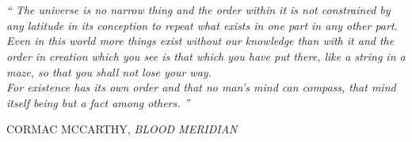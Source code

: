 
\updateRibbons{\textbf{\TEXTquotation}}{}
\chapter*{\hyperlink{toc}{}}
\chaptermark{\TEXTquotation}

\thispagestyle{empty}
\null\vfill

\newlength\longest

\settowidth{} %


\begin{center}
  \centering
  \parbox{\longest}{%
    \raggedright{\large\itshape%
    ``%
    The universe is no narrow thing and the order within it is not constrained by any latitude in its conception to repeat what exists in one part in any other part. Even in this world more things exist without our knowledge than with it and the order in creation which you see is that which you have put there, like a string in a maze, so that you shall not lose your way.\\
    For existence has its own order and that no man's mind can compass, that mind itself being but a fact among others.%
    ''%
    \par\bigskip\bigskip
    }
    \color{myColorPrimary}\raggedleft\normalsize\MakeUppercase{
      Cormac McCarthy, \textit{Blood Meridian}
      }
      \par%
  }
\end{center}

\vfill\vfill\vfill


